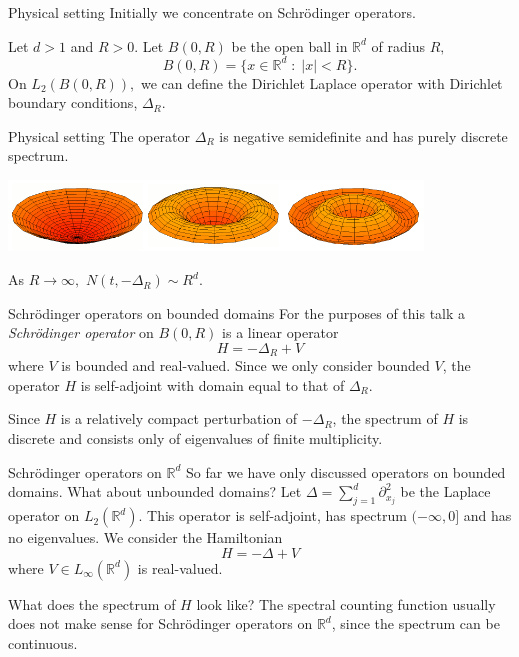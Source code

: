 \documentclass{beamer}
\numberwithin{equation}{section}
\theoremstyle{plain}
\theoremstyle{plain}
\theoremstyle{definition}
\theoremstyle{plain}
\theoremstyle{plain}
\theoremstyle{definition}
\newcommand{\Rl}{\mathbb{R}}
\begin{document}
\begin{frame}{Physical setting}
    Initially we concentrate on Schr\"odinger operators.

    Let $d > 1$ and $R > 0$. Let $B(0,R)$ be the open ball in $\Rl^d$ of radius $R,$
    \begin{equation*}
        B(0,R) = \{x\in \Rl^d\;:\;|x|<R\}.
    \end{equation*}
    \pause
    On $L_2(B(0,R)),$ we can define the Dirichlet Laplace operator with Dirichlet boundary conditions, $\Delta_R.$
\end{frame}

\begin{frame}{Physical setting}
    The operator $\Delta_R$ is negative semidefinite and has purely discrete spectrum.\\
    \begin{center}
    \includegraphics[width=110mm]{vibrating_drum.png}
    \end{center}
    As $R\to\infty,$ $N(t,-\Delta_R) \sim R^d.$
\end{frame}

\begin{frame}{Schr\"odinger operators on bounded domains}
    For the purposes of this talk a \emph{Schr\"odinger operator} on $B(0,R)$ is a linear operator
    $$
        H = -\Delta_R+V
    $$
    where $V$ is bounded and real-valued. Since we only consider bounded $V$, the operator $H$ is self-adjoint with domain equal to that of $\Delta_R$.\pause
    
    Since $H$ is a relatively compact
    perturbation of $-\Delta_R$, the spectrum of $H$ is discrete and consists only of eigenvalues of finite multiplicity. 
\end{frame}

\begin{frame}{Schr\"odinger operators on $\Rl^d$}
    So far we have only discussed operators on bounded domains. What about unbounded domains?
    Let $\Delta = \sum_{j=1}^d \partial_{x_j}^2$ be the Laplace operator on $L_2(\Rl^d)$. This operator is self-adjoint,
    has spectrum $(-\infty,0]$ and has no eigenvalues. \pause We consider the Hamiltonian 
    $$
        H = -\Delta+V
    $$
    where $V \in L_\infty(\Rl^d)$ is real-valued.
    
    What does the spectrum of $H$ look like?  \pause
    The spectral counting function usually does not make sense for Schr\"odinger operators on $\Rl^d$, since the spectrum can be continuous.
\end{frame}
\end{document}
